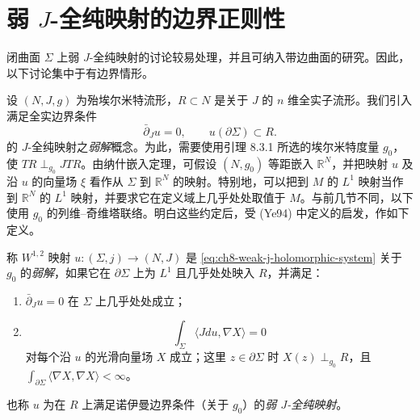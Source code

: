 \section{弱 \texorpdfstring{$J$}{J}-全纯映射的边界正则性}
\label{sec:boundary-regularity-weak-j-holomorphic}

闭曲面 $\Sigma$ 上弱 $J$-全纯映射的讨论较易处理，并且可纳入带边曲面的研究。因此，以下讨论集中于有边界情形。

设 $(N,J,g)$ 为殆埃尔米特流形，$R\subset N$ 是关于 $J$ 的 $n$ 维全实子流形。我们引入满足全实边界条件
\begin{equation}
 \bar\partial_Ju=0,\qquad u(\partial\Sigma)\subset R.
 \label{eq:ch8-weak-j-holomorphic-system}
\end{equation}
的 $J$-全纯映射之\emph{弱解}概念。为此，需要使用引理 8.3.1 所选的埃尔米特度量
$g_0$，使 $TR\perp_{g_0}JTR$。由纳什嵌入定理，可假设 $(N,g_0)$ 等距嵌入
$\mathbb R^N$，并把映射 $u$ 及沿 $u$ 的向量场 $\xi$ 看作从 $\Sigma$ 到
$\mathbb R^N$ 的映射。特别地，可以把到 $M$ 的 $L^1$ 映射当作到 $\mathbb R^N$
的 $L^1$ 映射，并要求它在定义域上几乎处处取值于 $M$。与前几节不同，以下使用
$g_0$ 的列维--奇维塔联络。明白这些约定后，受 (Ye94) 中定义的启发，作如下定义。

\begin{definition}\label{def:ch8-weak-j-holomorphic-neumann}
称 $W^{1,2}$ 映射 $u:(\Sigma,j)\to(N,J)$ 是 \eqref{eq:ch8-weak-j-holomorphic-system} 关于 $g_0$ 的\emph{弱解}，如果它在 $\partial\Sigma$ 上为 $L^1$ 且几乎处处映入 $R$，并满足：
\begin{enumerate}[label=(\arabic*)]
\item $\bar\partial_Ju=0$ 在 $\Sigma$ 上几乎处处成立；
\item
\begin{equation}
 \int_\Sigma\langle Jdu,\nabla X\rangle=0
 \label{eq:ch8-weak-neumann-condition}
\end{equation}
对每个沿 $u$ 的光滑向量场 $X$ 成立；这里 $z\in\partial\Sigma$ 时
$X(z)\perp_{g_0}R$，且 $\int_{\partial\Sigma}\langle\nabla X,\nabla X\rangle<\infty$。
\end{enumerate}
也称 $u$ 为在 $R$ 上满足诺伊曼边界条件（关于 $g_0$）的\emph{弱 $J$-全纯映射}。
\end{definition}

